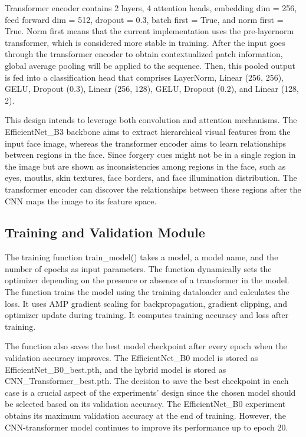 \documentclass[12pt,a4paper]{report}
\begin{document}
Transformer encoder contains 2 layers, 4 attention heads, embedding dim = 256, feed forward dim = 512, dropout = 0.3, batch first = True, and norm first = True. Norm first means that the current implementation uses the pre-layernorm transformer, which is considered more stable in training. After the input goes through the transformer encoder to obtain contextualized patch information, global average pooling will be applied to the sequence. Then, this pooled output is fed into a classification head that comprises LayerNorm, Linear (256, 256), GELU, Dropout (0.3), Linear (256, 128), GELU, Dropout (0.2), and Linear (128, 2).

This design intends to leverage both convolution and attention mechanisms. The EfficientNet\_B3 backbone aims to extract hierarchical visual features from the input face image, whereas the transformer encoder aims to learn relationships between regions in the face. Since forgery cues might not be in a single region in the image but are shown as inconsistencies among regions in the face, such as eyes, mouths, skin textures, face borders, and face illumination distribution. The transformer encoder can discover the relationships between these regions after the CNN maps the image to its feature space.

\subsection{Training and Validation Module}

The training function train\_model() takes a model, a model name, and the number of epochs as input parameters. The function dynamically sets the optimizer depending on the presence or absence of a transformer in the model. The function trains the model using the training dataloader and calculates the loss. It uses AMP gradient scaling for backpropagation, gradient clipping, and optimizer update during training. It computes training accuracy and loss after training.

The function also saves the best model checkpoint after every epoch when the validation accuracy improves. The EfficientNet\_B0 model is stored as EfficientNet\_B0\_best.pth, and the hybrid model is stored as CNN\_Transformer\_best.pth. The decision to save the best checkpoint in each case is a crucial aspect of the experiments' design since the chosen model should be selected based on its validation accuracy. The EfficientNet\_B0 experiment obtains its maximum validation accuracy at the end of training. However, the CNN-transformer model continues to improve its performance up to epoch 20.
\end{document}
